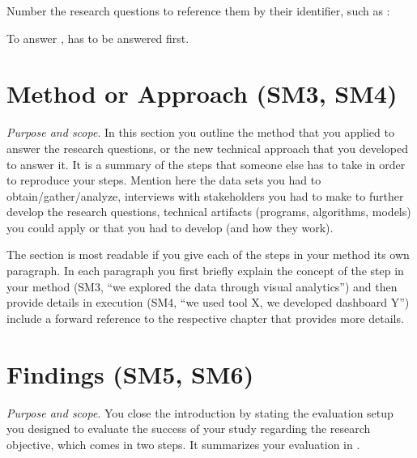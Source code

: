 \documentclass[../thesis-example-en]{subfiles}
\begin{document}
Number the research questions to reference them by their identifier, such as :



To answer ,  has to be answered first.

\section{Method or Approach (SM3, SM4)}\label{sec:introduction:method}

\emph{Purpose and scope}.
In this section you outline the method that you applied to answer the research questions, or the new technical approach that you developed to answer it.
It is a summary of the steps that someone else has to take in order to reproduce your steps.
Mention here the data sets you had to obtain/gather/analyze, interviews with stakeholders you had to make to further develop the research questions, technical artifacts (programs, algorithms, models) you could apply or that you had to develop (and how they work).

The section is most readable if you give each of the steps in your method its own paragraph.
In each paragraph you first briefly explain the concept of the step in your method (SM3, ``we explored the data through visual analytics'') and then provide details in execution (SM4, ``we used tool X, we developed dashboard Y'') include a forward reference to the respective chapter that provides more details.

\section{Findings (SM5, SM6)}\label{sec:introduction:results}

\emph{Purpose and scope}.
You close the introduction by stating the evaluation setup you designed to evaluate the success of your study regarding the research objective, which comes in two steps.
It summarizes your evaluation in .
\end{document}
